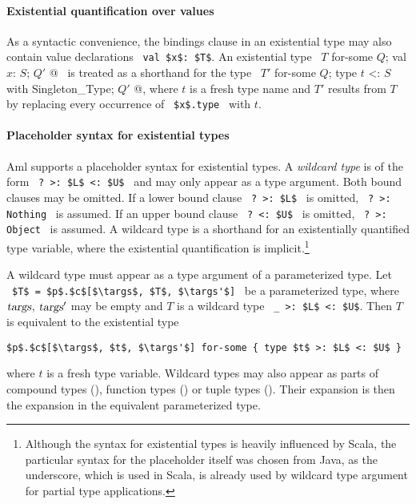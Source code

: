\paragraph{Existential quantification over values}
As a syntactic convenience, the bindings clause in an existential type may also contain value declarations ~\lstinline!val $x$: $T$!. An existential type ~\lstinline@$T$ for-some { $Q$; val $x$: $S$; $Q'$ }@~ is treated as a shorthand for the type ~\lstinline@$T'$ for-some { $Q$; type $t$ <: $S$ with Singleton_Type; $Q'$ }@, where $t$ is a fresh type name and $T'$ results from $T$ by replacing every occurrence of ~\lstinline!$x$.type!~ with $t$. 



\paragraph{Placeholder syntax for existential types}
\label{par:placeholder-existential-types}
Aml supports a placeholder syntax for existential types. A {\em wildcard type} is of the form ~\lstinline!? >: $L$ <: $U$!~ and may only appear as a type argument. Both bound clauses may be omitted. If a lower bound clause ~\lstinline!? >: $L$!~ is omitted, ~\lstinline!? >: Nothing!~ is assumed. If an upper bound clause ~\lstinline!? <: $U$!~ is omitted, ~\lstinline!? >: Object!~ is assumed. A wildcard type is a shorthand for an existentially quantified type variable, where the existential quantification is implicit.\footnote{Although the syntax for existential types is heavily influenced by Scala, the particular syntax for the placeholder itself was chosen from Java, as the underscore, which is used in Scala, is already used by wildcard type argument for partial type applications.}

A wildcard type must appear as a type argument of a parameterized type. Let ~\lstinline!$T$ = $p$.$c$[$\targs$, $T$, $\targs'$]!~ be a parameterized type, where $\mbox{\sl targs}$, $\mbox{\sl targs}'$ may be empty and $T$ is a wildcard type ~\lstinline!_ >: $L$ <: $U$!. Then $T$ is equivalent to the existential type
\begin{lstlisting}
$p$.$c$[$\targs$, $t$, $\targs'$] for-some { type $t$ >: $L$ <: $U$ }
\end{lstlisting}
where $t$ is a fresh type variable. Wildcard types may also appear as parts of compound types (), function types () or tuple types (). Their expansion is then the expansion in the equivalent parameterized type. 

